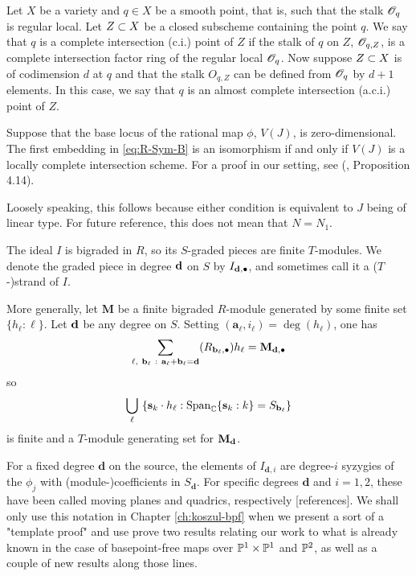 \documentclass[fleqn,reqno]{amsart}
\begin{document}
\begin{paragraf}
\label{par:ci-points}
Let $X$ be a variety and $q\in X$ be a smooth point, that is,
such that the stalk $\mathscr{O}_q$ is regular local.
Let $Z\subset X$ be a closed subscheme containing the point $q$.
We say that $q$ is a complete intersection (c.i.) point of $Z$
if the stalk of $q$ on $Z$, $\mathscr{O}_{q,Z}$,
is a complete intersection factor ring of the regular local $\mathscr{O}_q$.
Now suppose $Z\subset X$ is of codimension $d$ at $q$
and that the stalk $O_{q,Z}$ can be defined from $\mathscr{O}_q$ by $d+1$ elements.
In this case, we say that $q$ is an almost complete intersection (a.c.i.)
point of $Z$.
\end{paragraf}

\begin{paragraf}
\label{par:linear-type}
Suppose that the base locus of the rational map $\phi$, $V(J)$, is zero-dimensional.
The first embedding in \eqref{eq:R-Sym-B} is an isomorphism if and only if
$V(J)$ is a locally complete intersection scheme.
For a proof in our setting, see (\citet{BJ-03}, Proposition 4.14).

Loosely speaking, this follows because either condition is equivalent to $J$ being of linear type.
For future reference, this does not mean that $N=N_1$.
\end{paragraf}

\begin{paragraf}
\label{lemma:push-gens}
The ideal $I$ is bigraded in $R$, so its $S$-graded pieces are finite $T$-modules.
We denote the graded piece in degree $\mathbf d$ on $S$ by $I_{\mathbf d,\bullet}$,
and sometimes call it a ($T$-)strand of $I$.

More generally, let $\mathbf M$ be a finite bigraded $R$-module
generated by some finite set $\{h_\ell:\ell\}$.
Let $\mathbf d$ be any degree on $S$.
Setting $({\mathbf a}_\ell,i_\ell)=\deg(h_\ell)$, one has
\[
	\displaystyle\sum_{\ell,~{\mathbf b}_\ell~:~{\mathbf a}_\ell+{\mathbf b}_\ell=\mathbf d}
	(R_{{\mathbf b}_\ell,\bullet}) h_\ell={\mathbf M}_{\mathbf d,\bullet}
\]
so
\[
	\displaystyle\bigcup_{\ell}~\{\mathbf s_k\cdot h_\ell:\operatorname{Span}_{\mathbb{C}}\{\mathbf s_k:k\}=
	S_{{\mathbf b}_\ell}\}
\]
is finite and a $T$-module generating set for $\mathbf M_\mathbf d$.
\end{paragraf}

\begin{paragraf}
\label{par:moving-planes-notation}
For a fixed degree $\mathbf d$ on the source,
the elements of $I_{\mathbf d,i}$ are degree-$i$ syzygies of the $\phi_j$ with (module-)coefficients
in $S_{\mathbf d}$.
For specific degrees $\mathbf d$ and $i=1,2$, these have been called moving planes and quadrics,
respectively [references].
We shall only use this notation in Chapter \ref{ch:koszul-bpf} when we present a sort of a "template proof"
and use prove two results relating our work to what is already known in the case of
basepoint-free maps over $\mathbb{P}^1\times\mathbb{P}^1$ and $\mathbb{P}^2$,
as well as a couple of new results along those lines.
\end{paragraf}
\end{document}
